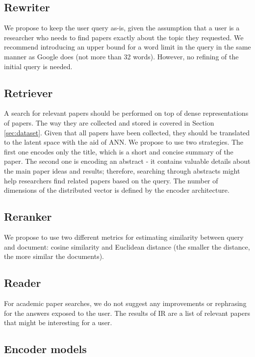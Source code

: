 \documentclass{article}
\begin{document}
    \subsection{Rewriter}
    
        We propose to keep the user query as-is, given the assumption that a user is a researcher who needs to find papers exactly about the topic they requested. We recommend introducing an upper bound for a word limit in the query in the same manner as Google does (not more than 32 words). However, no refining of the initial query is needed.

    \subsection{Retriever}
    
        A search for relevant papers should be performed on top of dense representations of papers. The way they are collected and stored is covered in Section \ref{sec:dataset}. Given that all papers have been collected, they should be translated to the latent space with the aid of ANN. We propose to use two strategies. The first one encodes only the title, which is a short and concise summary of the paper. The second one is encoding an abstract - it contains valuable details about the main paper ideas and results; therefore, searching through abstracts might help researchers find related papers based on the query. The number of dimensions of the distributed vector is defined by the encoder architecture.

    \subsection{Reranker}

        We propose to use two different metrics for estimating similarity between query and document: cosine similarity and Euclidean distance (the smaller the distance, the more similar the documents).
        
    \subsection{Reader}

        For academic paper searches, we do not suggest any improvements or rephrasing for the answers exposed to the user. The results of IR are a list of relevant papers that might be interesting for a user.

    
    \subsection{Encoder models}
        
\end{document}

